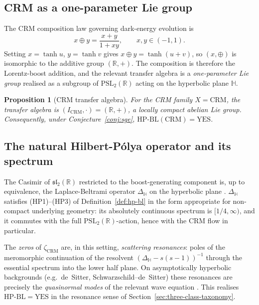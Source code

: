 \documentclass[11pt]{article}
\newtheorem{proposition}[theorem]{Proposition}
\theoremstyle{definition}
\theoremstyle{remark}
\newcommand{\HBL}{\mathrm{HP\text{-}BL}}
\newcommand{\PSL}{\mathrm{PSL}}
\begin{document}
\subsection{CRM as a one-parameter Lie group}

The CRM composition law governing dark-energy evolution is
\begin{equation}
\label{eq:crm-composition}
  x \oplus y = \frac{x+y}{1+xy}, \qquad x, y \in (-1, 1).
\end{equation}
Setting $x = \tanh u$, $y = \tanh v$ gives $x \oplus y = \tanh(u+v)$,
so $(x, \oplus)$ is isomorphic to the additive group $(\mathbb{R},
+)$. The composition is therefore the Lorentz-boost addition, and
the relevant transfer algebra is a \emph{one-parameter Lie group}
realised as a subgroup of $\PSL_2(\mathbb{R})$ acting on the
hyperbolic plane $\mathbb{H}$.

\begin{proposition}[CRM transfer algebra]\label{prop:crm-transfer}
For the CRM family $X = \mathrm{CRM}$, the transfer algebra is
$(I_{\mathrm{CRM}}, \cdot) = (\mathbb{R}, +)$, a locally compact
abelian Lie group. Consequently, under Conjecture~\ref{conj:sge},
$\HBL(\mathrm{CRM}) = \mathrm{YES}$.
\end{proposition}

\subsection{The natural Hilbert-P\'olya operator and its spectrum}

The Casimir of $\mathfrak{sl}_2(\mathbb{R})$ restricted to the
boost-generating component is, up to equivalence, the
Laplace-Beltrami operator $\Delta_{\mathbb{H}}$ on the hyperbolic
plane \cite{DyatlovZworski2019}. $\Delta_{\mathbb{H}}$ satisfies
(HP1)--(HP3) of Definition~\ref{def:hp-bl} in the form appropriate
for non-compact underlying geometry: its absolutely continuous
spectrum is $[1/4, \infty)$, and it commutes with the full
$\PSL_2(\mathbb{R})$-action, hence with the CRM flow in particular.

The \emph{zeros} of $\zeta_{\mathrm{CRM}}$ are, in this setting,
\emph{scattering resonances}: poles of the meromorphic continuation
of the resolvent $(\Delta_{\mathbb{H}} - s(s-1))^{-1}$ through the
essential spectrum into the lower half plane. On asymptotically
hyperbolic backgrounds (e.g.\ de~Sitter, Schwarzschild--de~Sitter)
these resonances are precisely the \emph{quasinormal modes} of the
relevant wave equation \cite{DyatlovZworski2019}. This realises
$\HBL = \mathrm{YES}$ in the resonance sense of
Section~\ref{sec:three-class-taxonomy}.
\end{document}
